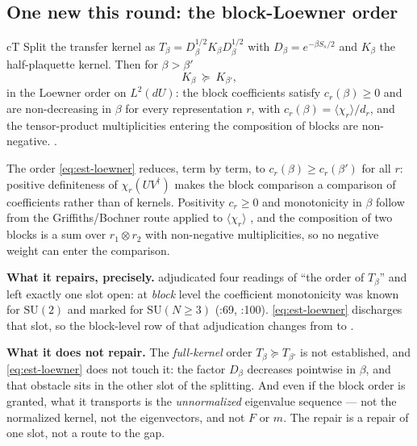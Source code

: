 \subsection{One new \texorpdfstring{\LT}{[T]} this round: the block-Loewner order}
\label{sec:est-loewner}

\begin{claimbox}{cT}
 Split the transfer kernel as
$T_\beta=D_\beta^{1/2}K_\beta D_\beta^{1/2}$ with $D_\beta=e^{-\beta S_s/2}$ and $K_\beta$ the
half-plaquette kernel. Then for $\beta>\beta'$
\begin{equation}
K_\beta\ \succeq\ K_{\beta'} ,
\label{eq:est-loewner}
\end{equation}
in the Loewner order on $L^2(dU)$: the block coefficients satisfy $c_r(\beta)\ge0$ and are
non-decreasing in $\beta$ for every representation $r$, with $c_r(\beta)=\langle\chi_r\rangle/d_r$, and
the tensor-product multiplicities entering the composition of blocks are non-negative.
\LT.
\end{claimbox}

\begin{proofx}
The order \eqref{eq:est-loewner} reduces, term by term, to $c_r(\beta)\ge c_r(\beta')$ for all $r$:
positive definiteness of $\chi_r(UV^\dagger)$ makes the block comparison a comparison of coefficients
rather than of kernels. Positivity $c_r\ge0$ and monotonicity in $\beta$ follow from the
Griffiths/Bochner route applied to $\langle\chi_r\rangle$ \cite{griffiths,ginibre,ksherman}, and the
composition of two blocks is a sum over $r_1\otimes r_2$ with non-negative multiplicities, so no
negative weight can enter the comparison.
\end{proofx}

\noindent\textbf{What it repairs, precisely.}  adjudicated four readings of ``the
order of $T_\beta$'' and left exactly one slot open: at \emph{block} level the coefficient
monotonicity was known for $\mathrm{SU}(2)$ and marked \LN{} for $\mathrm{SU}(N\ge3)$
(:69, :100). \eqref{eq:est-loewner} discharges that slot, so the block-level row of
that adjudication changes from \LN{} to \LT. 

\smallskip
\noindent\textbf{What it does not repair.} The \emph{full-kernel} order $T_\beta\succeq T_{\beta'}$
is not established, and \eqref{eq:est-loewner} does not touch it: the factor $D_\beta$ decreases
pointwise in $\beta$, and that obstacle sits in the other slot of the splitting. And even if the
block order is granted, what it transports is the \emph{unnormalized} eigenvalue sequence --- not the
normalized kernel, not the eigenvectors, and not $F$ or $m$. The repair is a repair of one slot, not
a route to the gap. 

